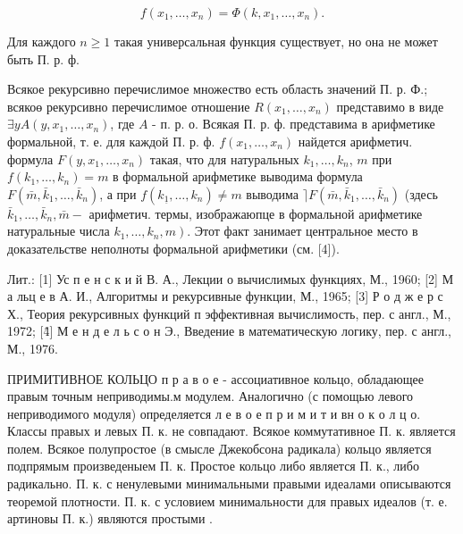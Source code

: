 \documentclass[10pt]{article}
\begin{document}
\[

f\left(x_{1}, \ldots, x_{n}\right)=\Phi\left(k, x_{1}, \ldots, x_{n}\right) .

\]



Для каждого $n \geqslant 1$ такая универсальная функция существует, но она не может быть П. р. ф.



Всякое рекурсивно перечислимое множество есть область значений П. р. Ф.; всякоө рекурсивно перечислимое отношение $R\left(x_{1}, \ldots, x_{n}\right)$ представимо в виде $\exists y A\left(y, x_{1}, \ldots, x_{n}\right)$, где $A$ - п. р. о. Всякая П. р. ф. представима в арифметике формальной, т. е. для каждой П. р. ф. $f\left(x_{1}, \ldots, x_{n}\right)$ найдется арифметич. формула $F\left(y, x_{1}, \ldots, x_{n}\right)$ такая, что для натуральных $k_{1}, \ldots, k_{n}$, $m$ при $f\left(k_{1}, \ldots, k_{n}\right)=m$ в формальной арифметике выводима формула $F\left(\bar{m}, \bar{k}_{1}, \ldots, \bar{k}_{n}\right)$, а при $f\left(k_{\underline{1}}, \ldots, k_{n}\right) \neq m$ выводима $\rceil F\left(\bar{m}, \bar{k}_{1}, \ldots, \bar{k}_{n}\right)$ (здесь $\bar{k}_{1}, \ldots, \bar{k}_{n}, \bar{m}-$ арифметич. термы, изображаюпце в формальной арифметике натуральные числа $\left.k_{1}, \ldots, k_{n}, m\right)$. Этот факт занимает центральное место в доказательстве неполноты формальной арифметики (см. [4]).



Лит.: [1] Ус п е н с к и й В. А., Лекции о вычислимых функциях, М., 1960; [2] М а льц е в А. И., Алгоритмы и рекурсивные функции, М., 1965; [3] Р о д ж е р с Х., Теория рекурсивных функций п эффективная вычислимость, пер. с англ., М., 1972; [4̂] М е н д е л ь с о н Э., Введение в математическую логику, пер. с англ., М., 1976.



ПРИМИТИВНОЕ КОЛЬЦО п р а в о е - ассоциативное кольцо, обладающее правым точным неприводимы.м модулем. Аналогично (с помощью левого неприводимого модуля) определяется л е в о е п р и м и т и вн о к о л ц о. Классы правых и левых П. к. не совпадают. Всякое коммутативное П. к. является полем. Всякое полупростое (в смысле Джекобсона радикала) кольцо является подпрямым произведеныем П. к. Простое кольцо либо является П. к., либо радикально. П. к. с ненулевыми минимальными правыми идеалами описываются теоремой плотности. П. к. с условием минимальности для правых идеалов (т. е. артиновы П. к.) являются простыми .
\end{document}
